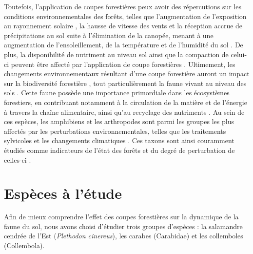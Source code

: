 Toutefois, l'application de coupes forestières peux avoir des répercutions sur les conditions environnementales des forêts, 
telles que l'augmentation de l'exposition au rayonnement solaire , la hausse de vitesse des vents et la réception accrue de précipitations au sol suite à l'élimination de la canopée, 
menant à une augmentation de l'ensoleillement, de la température et de l'humidité du sol \citep{Keenan1993ecologicaleffects,Lindo2003Microbialbiomass,Heithecker2007Edgerelatedgradients}.
De plus, la disponibilité de nutriment au niveau sol ainsi que la compaction de celui-ci peuvent être affecté par l'application de coupe forestières \citep{Battigelli2004Shorttermimpact,Covington1981Changesforest,Lindo2003Microbialbiomass,rousseauLongtermEffectsBiomass2018}. 
Ultimement, les changements environnementaux résultant d'une coupe forestière auront un impact sur la biodiversité forestière \citep{Chaudhary2016Impactforest,Fedrowitz2014Canretention,Paillet2010Biodiversitydifferences}, 
tout particulièrement la faune vivant au niveau des sols \citep{Chaudhary2016ImpactforestLindo2003Microbialbiomass,Kudrin2023metaanalysiseffects}.
Cette faune possède une importance primordiale dans les écosystèmes forestiers, en contribuant notamment à la circulation de la matière et de l'énergie à travers la chaîne alimentaire, ainsi qu'au recyclage des nutriments \citep{Kudrin2023metaanalysiseffects,Seibold2021contributioninsects}.
Au sein de ces espèces, les amphibiens et les arthropodes sont parmi les groupes les plus affectés par les perturbations environnementales, 
telles que les traitements sylvicoles \citep{Hartshorn2021reviewforest,Semlitsch2009Effectstimber,Stuart2004Statustrends} et les changements climatiques \citep{Parmesan2006EcologicalEvolutionary,Pounds2006Widespreadamphibian,Warren2018projectedeffect}. 
Ces taxons sont ainsi couramment étudiés comme indicateurs de l'état des forêts et du degré de perturbation de celles-ci \citep{birdChangesSoilLitter2004,Maleque2009Arthropodsbioindicators,pongeVerticalDistributionCollembola2000}.


\section*{Espèces à l'étude}
\label{sec:species}

Afin de mieux comprendre l'effet des coupes forestières sur la dynamique de la faune du sol, nous avons choisi d'étudier trois groupes d'espèces : la salamandre cendrée de l'Est (\textit{Plethodon cinereus}), 
les carabes (Carabidae) et les collemboles (Collembola).

